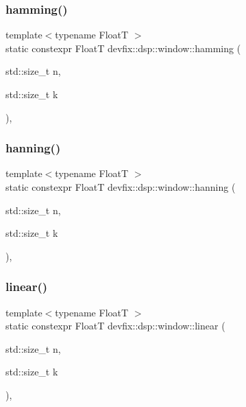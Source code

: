 \subsubsection{\texorpdfstring{hamming()}{hamming()}}
{\footnotesize\ttfamily template$<$typename FloatT $>$ \\
static constexpr FloatT devfix\+::dsp\+::window\+::hamming (\begin{DoxyParamCaption}\item[{std\+::size\+\_\+t}]{n,  }\item[{std\+::size\+\_\+t}]{k }\end{DoxyParamCaption})\hspace{0.3cm}{\ttfamily [inline]}, {\ttfamily [static]}}

\mbox{\label{structdevfix_1_1dsp_1_1window_a94b16d1da4a560e625ae93284ed6f1a4}} 
\subsubsection{\texorpdfstring{hanning()}{hanning()}}
{\footnotesize\ttfamily template$<$typename FloatT $>$ \\
static constexpr FloatT devfix\+::dsp\+::window\+::hanning (\begin{DoxyParamCaption}\item[{std\+::size\+\_\+t}]{n,  }\item[{std\+::size\+\_\+t}]{k }\end{DoxyParamCaption})\hspace{0.3cm}{\ttfamily [inline]}, {\ttfamily [static]}}

\mbox{\label{structdevfix_1_1dsp_1_1window_a334a42b01504381fb13459f566aa2025}} 
\subsubsection{\texorpdfstring{linear()}{linear()}}
{\footnotesize\ttfamily template$<$typename FloatT $>$ \\
static constexpr FloatT devfix\+::dsp\+::window\+::linear (\begin{DoxyParamCaption}\item[{std\+::size\+\_\+t}]{n,  }\item[{std\+::size\+\_\+t}]{k }\end{DoxyParamCaption})\hspace{0.3cm}{\ttfamily [inline]}, {\ttfamily [static]}}

